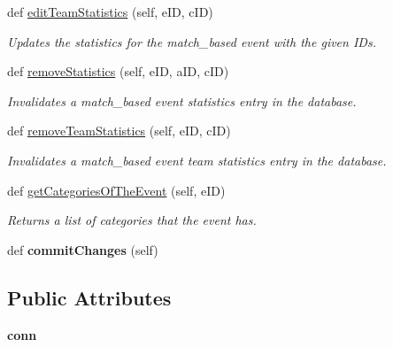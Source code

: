 \begin{DoxyCompactItemize}
def \hyperlink{classhandler_1_1dao_1_1match__based__event__dao_1_1_match_based_event_d_a_o_a88b2b7ae75538f75cd3a5d90c91572f3}{edit\+Team\+Statistics} (self, e\+ID, c\+ID)
\begin{DoxyCompactList}\small\item\em Updates the statistics for the match\+\_\+based event with the given I\+Ds. \end{DoxyCompactList}\item 
def \hyperlink{classhandler_1_1dao_1_1match__based__event__dao_1_1_match_based_event_d_a_o_a8234a607c25d64360e8de596ff9146fe}{remove\+Statistics} (self, e\+ID, a\+ID, c\+ID)
\begin{DoxyCompactList}\small\item\em Invalidates a match\+\_\+based event statistics entry in the database. \end{DoxyCompactList}\item 
def \hyperlink{classhandler_1_1dao_1_1match__based__event__dao_1_1_match_based_event_d_a_o_aee8505c4896c85c2517d003ffd129987}{remove\+Team\+Statistics} (self, e\+ID, c\+ID)
\begin{DoxyCompactList}\small\item\em Invalidates a match\+\_\+based event team statistics entry in the database. \end{DoxyCompactList}\item 
def \hyperlink{classhandler_1_1dao_1_1match__based__event__dao_1_1_match_based_event_d_a_o_a5c7e4c6b112143f0161a2a03e2e62bc3}{get\+Categories\+Of\+The\+Event} (self, e\+ID)
\begin{DoxyCompactList}\small\item\em Returns a list of categories that the event has. \end{DoxyCompactList}\item 
\mbox{\label{classhandler_1_1dao_1_1match__based__event__dao_1_1_match_based_event_d_a_o_abc47a5939f665bbaf64334d3de9ee081}} 
def {\bfseries commit\+Changes} (self)
\end{DoxyCompactItemize}
\subsection*{Public Attributes}
\begin{DoxyCompactItemize}
\item 
\mbox{\label{classhandler_1_1dao_1_1match__based__event__dao_1_1_match_based_event_d_a_o_a63c732226324dc39f84acb2be45554d5}} 
{\bfseries conn}
\end{DoxyCompactItemize}


